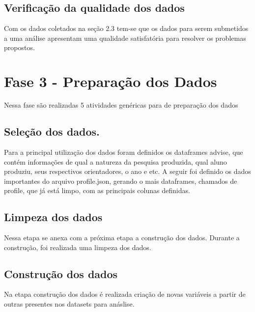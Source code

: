 \documentclass[]{article}
\begin{document}
\hypertarget{verificauxe7uxe3o-da-qualidade-dos-dados}{%
\subsection{Verificação da qualidade dos
dados}\label{verificauxe7uxe3o-da-qualidade-dos-dados}}

Com os dados coletados na seção 2.3 tem-se que os dados para serem
submetidos a uma análise apresentam uma qualidade satisfatória para
resolver os problemas propostos.

\hypertarget{fase-3---preparauxe7uxe3o-dos-dados}{%
\section{Fase 3 - Preparação dos
Dados}\label{fase-3---preparauxe7uxe3o-dos-dados}}

Nessa fase são realizadas 5 atividades genéricas para de preparação dos
dados

\hypertarget{seleuxe7uxe3o-dos-dados.}{%
\subsection{Seleção dos dados.}\label{seleuxe7uxe3o-dos-dados.}}

Para a principal utilização dos dados foram definidos os dataframes
advise, que contém informações de qual a natureza da pesquisa produzida,
qual aluno produziu, seus respectivos orientadores, o ano e etc. A
seguir foi definido os dados importantes do arquivo profile.json,
gerando o mais dataframes, chamados de profile, que já está limpo, com
as principais colunas definidas.

\hypertarget{limpeza-dos-dados}{%
\subsection{Limpeza dos dados}\label{limpeza-dos-dados}}

Nessa etapa se anexa com a próxima etapa a construção dos dados. Durante
a construção, foi realizada uma limpeza dos dados.

\hypertarget{construuxe7uxe3o-dos-dados}{%
\subsection{Construção dos dados}\label{construuxe7uxe3o-dos-dados}}

Na etapa construção dos dados é realizada criação de novas variáveis a
partir de outras presentes nos datasets para anáslise.
\end{document}
